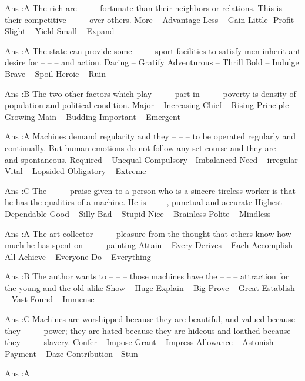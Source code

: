     Ans :A
    The rich are -- -- -- fortunate than their neighbors or relations. This is their competitive -- -- -- over others.
        More – Advantage
        Less – Gain
        Little- Profit
        Slight – Yield
        Small – Expand 

    Ans :A
    The state can provide some -- -- -- sport facilities to satisfy men inherit ant desire for -- -- -- and action.
        Daring – Gratify
        Adventurous – Thrill
        Bold – Indulge
        Brave – Spoil
        Heroic – Ruin 

    Ans :B
    The two other factors which play -- -- -- part in -- -- -- poverty is density of population and political condition.
        Major – Increasing
        Chief – Rising
        Principle – Growing
        Main – Budding
        Important – Emergent 

    Ans :A
    Machines demand regularity and they -- -- -- to be operated regularly and continually. But human emotions do not follow any set course and they are -- -- -- and spontaneous.
        Required – Unequal
        Compulsory - Imbalanced
        Need – irregular
        Vital – Lopsided
        Obligatory – Extreme 

    Ans :C
    The -- -- -- praise given to a person who is a sincere tireless worker is that he has the qualities of a machine. He is -- -- --, punctual and accurate
        Highest – Dependable
        Good – Silly
        Bad – Stupid
        Nice – Brainless
        Polite – Mindless 

    Ans :A
    The art collector -- -- -- pleasure from the thought that others know how much he has spent on -- -- -- painting
        Attain – Every
        Derives – Each
        Accomplish – All
        Achieve – Everyone
        Do – Everything 

    Ans :B
    The author wants to -- -- -- those machines have the -- -- -- attraction for the young and the old alike
        Show – Huge
        Explain – Big
        Prove – Great
        Establish – Vast
        Found – Immense 

    Ans :C
    Machines are worshipped because they are beautiful, and valued because they -- -- -- power; they are hated because they are hideous and loathed because they -- -- -- slavery.
        Confer – Impose
        Grant – Impress
        Allowance – Astonish
        Payment – Daze
        Contribution - Stun 

    Ans :A 



